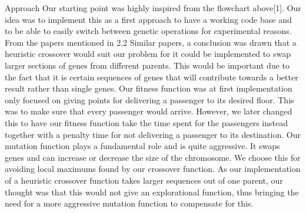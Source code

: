 Approach
Our starting point was highly inspired from the flowchart above[1]. Our idea was to implement this as a first approach to have a working code base and to be able to easily switch between genetic operations for experimental reasons. From the papers mentioned in 2.2 Similar papers, a conclusion was drawn that a heuristic crossover would suit our problem for it could be implemented to swap larger sections of genes from different parents. This would be important due to the fact that it is certain sequences of genes that will contribute towards a better result rather than single genes. Our fitness function was at first implementation only focused on giving points for delivering a passenger to its desired floor. This was to make sure that every passenger would arrive. However, we later changed this to have our fitness function take the time spent for the passengers instead together with a penalty time for not delivering a passenger to its destination. Our mutation function plays a fundamental role and is quite aggressive. It swaps genes and can increase or decrease the size of the chromosome. We choose this for avoiding local maximums found by our crossover function. As our implementation of a heuristic crossover function takes larger sequences out of one parent, our thought was that this would not give an explorational function, thus bringing the need for a more aggressive mutation function to compensate for this.
